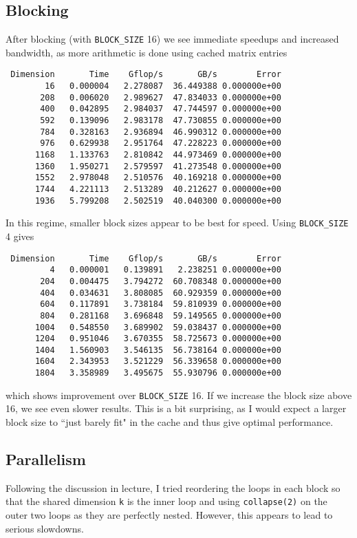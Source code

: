 \documentclass{article}
\begin{document}
\subsection{Blocking}
After blocking (with \texttt{BLOCK\_SIZE} 16) we see immediate speedups and
increased bandwidth, as more arithmetic is done using cached matrix entries
\begin{verbatim}
 Dimension       Time    Gflop/s       GB/s        Error
        16   0.000004   2.278087  36.449388 0.000000e+00
       208   0.006020   2.989627  47.834033 0.000000e+00
       400   0.042895   2.984037  47.744597 0.000000e+00
       592   0.139096   2.983178  47.730855 0.000000e+00
       784   0.328163   2.936894  46.990312 0.000000e+00
       976   0.629938   2.951764  47.228223 0.000000e+00
      1168   1.133763   2.810842  44.973469 0.000000e+00
      1360   1.950271   2.579597  41.273548 0.000000e+00
      1552   2.978048   2.510576  40.169218 0.000000e+00
      1744   4.221113   2.513289  40.212627 0.000000e+00
      1936   5.799208   2.502519  40.040300 0.000000e+00
\end{verbatim}
In this regime, smaller block sizes appear to be best for speed. Using
\texttt{BLOCK\_SIZE} 4 gives
\begin{verbatim}
 Dimension       Time    Gflop/s       GB/s        Error
         4   0.000001   0.139891   2.238251 0.000000e+00
       204   0.004475   3.794272  60.708348 0.000000e+00
       404   0.034631   3.808085  60.929359 0.000000e+00
       604   0.117891   3.738184  59.810939 0.000000e+00
       804   0.281168   3.696848  59.149565 0.000000e+00
      1004   0.548550   3.689902  59.038437 0.000000e+00
      1204   0.951046   3.670355  58.725673 0.000000e+00
      1404   1.560903   3.546135  56.738164 0.000000e+00
      1604   2.343953   3.521229  56.339658 0.000000e+00
      1804   3.358989   3.495675  55.930796 0.000000e+00
\end{verbatim}
which shows improvement over \texttt{BLOCK\_SIZE} 16. If we increase the block
size above 16, we see even slower results. This is a bit surprising, as I would
expect a larger block size to ``just barely fit" in the cache and thus give
optimal performance.

\subsection{Parallelism}
Following the discussion in lecture, I tried reordering the loops in each block
so that the shared dimension \texttt{k} is the inner loop and using
\texttt{collapse(2)} on the outer two loops as they are perfectly nested.
However, this appears to lead to serious slowdowns. 
\end{document}
